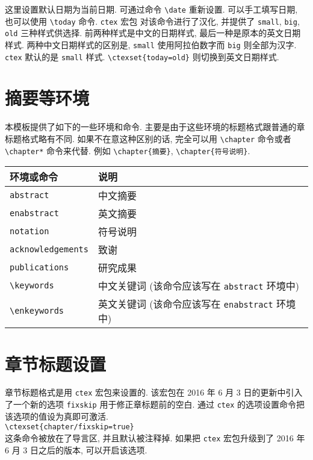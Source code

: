 这里设置默认日期为当前日期. 可通过命令 \verb|\date| 重新设置. 可以手工填写日期, 也可以使用 \verb|\today| 命令. \verb|ctex| 宏包 对该命令进行了汉化, 并提供了 \verb|small|, \verb|big|, \verb|old| 三种样式供选择. 前两种样式是中文的日期样式, 最后一种是原本的英文日期样式. 两种中文日期样式的区别是, \verb|small| 使用阿拉伯数字而 \verb|big| 则全部为汉字. \verb|ctex| 默认的是 \verb|small| 样式. \verb|\ctexset{today=old}| 则切换到英文日期样式.

\section{摘要等环境}

本模板提供了如下的一些环境和命令. 主要是由于这些环境的标题格式跟普通的章标题格式略有不同. 如果不在意这种区别的话, 完全可以用 \verb|\chapter| 命令或者 \verb|\chapter*| 命令来代替. 例如 \verb|\chapter{摘要}|, \verb|\chapter{符号说明}|.

\begin{center}
  \begin{tabular}{ll}
    \toprule
    环境或命令              & 说明\\
    \midrule
    \verb|abstract|         & 中文摘要\\
    \verb|enabstract|       & 英文摘要\\
    \verb|notation|         & 符号说明\\
    \verb|acknowledgements| & 致谢\\
    \verb|publications|     & 研究成果\\
    \midrule
    \verb|\keywords|        & 中文关键词 (该命令应该写在 \verb|abstract| 环境中)\\
    \verb|\enkeywords|      & 英文关键词 (该命令应该写在 \verb|enabstract| 环境中)\\
    \bottomrule
  \end{tabular}
\end{center}

\section{章节标题设置}

章节标题格式是用 \verb|ctex| 宏包来设置的. 该宏包在 2016 年 6 月 3 日的更新中引入了一个新的选项 \verb|fixskip| 用于修正章标题前的空白. 通过 \verb|ctex| 的选项设置命令把该选项的值设为真即可激活.\\
\verb|\ctexset{chapter/fixskip=true}|\\
这条命令被放在了导言区, 并且默认被注释掉. 如果把 \verb|ctex| 宏包升级到了 2016 年 6 月 3 日之后的版本, 可以开启该选项.

